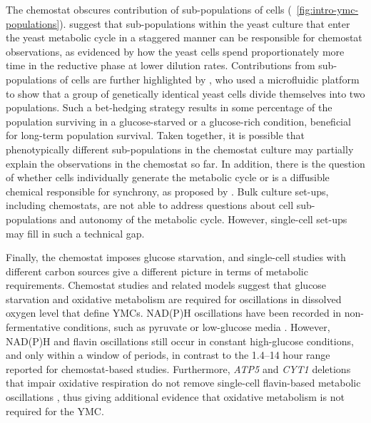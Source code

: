 The chemostat obscures contribution of sub-populations of cells (~\ref{fig:intro-ymc-populations}).
\textcite{burnettiCellCycleStart2016} suggest that sub-populations within the yeast culture that enter the yeast metabolic cycle in a staggered manner can be responsible for chemostat observations, as evidenced by how the yeast cells spend proportionately more time in the reductive phase at lower dilution rates.
Contributions from sub-populations of cells are further highlighted by \textcite{bagameryPutativeBetHedgingStrategy2020}, who used a microfluidic platform to show that a group of genetically identical yeast cells divide themselves into two populations.
Such a bet-hedging strategy results in some percentage of the population surviving in a glucose-starved or a glucose-rich condition, beneficial for long-term population survival.
Taken together, it is possible that phenotypically different sub-populations in the chemostat culture may partially explain the observations in the chemostat so far.
In addition, there is the question of whether cells individually generate the metabolic cycle or is a diffusible chemical responsible for synchrony, as proposed by \textcite{krishnaMinimalPushPull2018}.
Bulk culture set-ups, including chemostats, are not able to address questions about cell sub-populations and autonomy of the metabolic cycle.
However, single-cell set-ups may fill in such a technical gap.

Finally, the chemostat imposes glucose starvation, and single-cell studies with different carbon sources give a different picture in terms of metabolic requirements.
Chemostat studies and related models suggest that glucose starvation and oxidative metabolism are required for oscillations in dissolved oxygen level that define YMCs.
NAD(P)H oscillations have been recorded in non-fermentative conditions, such as pyruvate or low-glucose media \parencite{papagiannakisAutonomousMetabolicOscillations2017}.
However, NAD(P)H \parencite{papagiannakisAutonomousMetabolicOscillations2017,ozsezenInferenceHighLevelInteraction2019} and flavin \parencite{baumgartnerFlavinbasedMetabolicCycles2018} oscillations still occur in constant high-glucose conditions, and only within a window of periods, in contrast to the 1.4--14 hour range reported for chemostat-based studies.
Furthermore, \emph{ATP5} and \emph{CYT1} deletions that impair oxidative respiration do not remove single-cell flavin-based metabolic oscillations \parencite{baumgartnerFlavinbasedMetabolicCycles2018}, thus giving additional evidence that oxidative metabolism is not required for the YMC.

